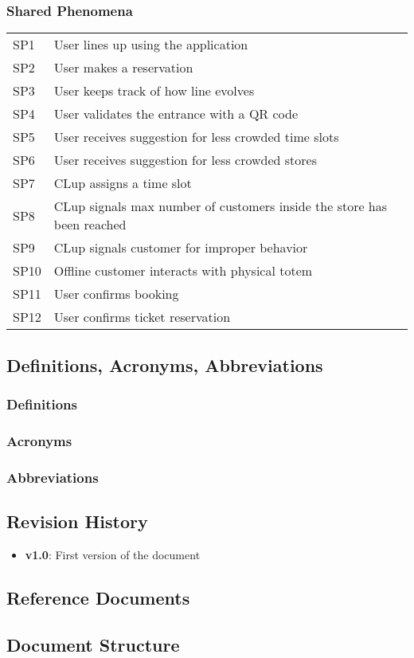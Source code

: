 \subsubsection{Shared Phenomena}
\begin{tabular}{l|l}
	SP1 & User lines up using the application \\
	SP2 & User makes a reservation \\
	SP3 & User keeps track of how line evolves \\
	SP4 & User validates the entrance with a QR code \\
	SP5 & User receives suggestion for less crowded time slots \\
	SP6 & User receives suggestion for less crowded stores \\
	SP7 & CLup assigns a time slot \\
	SP8 & CLup signals max number of customers inside the store has been reached \\
	SP9 & CLup signals customer for improper behavior \\
	SP10 & Offline customer interacts with physical totem \\
	SP11 & User confirms booking \\
	SP12 & User confirms ticket reservation \\
	
\end{tabular}

\subsection{Definitions, Acronyms, Abbreviations}

\subsubsection{Definitions}

\subsubsection{Acronyms}

\subsubsection{Abbreviations}


\subsection{Revision History}
\begin{itemize}
	\item
	\textbf{v1.0}: First version of the document
\end{itemize}


\subsection{Reference Documents}

\subsection{Document Structure}

